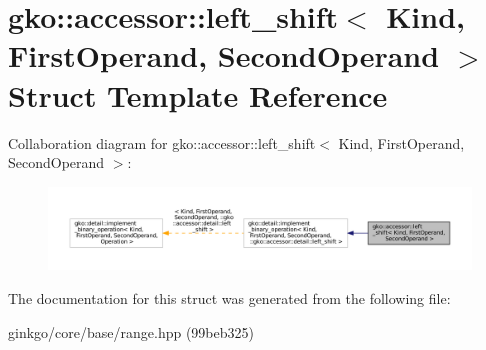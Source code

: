 \hypertarget{structgko_1_1accessor_1_1left__shift}{}\section{gko\+:\+:accessor\+:\+:left\+\_\+shift$<$ Kind, First\+Operand, Second\+Operand $>$ Struct Template Reference}
\label{structgko_1_1accessor_1_1left__shift}


Collaboration diagram for gko\+:\+:accessor\+:\+:left\+\_\+shift$<$ Kind, First\+Operand, Second\+Operand $>$\+:
\nopagebreak
\begin{figure}[H]
\begin{center}
\leavevmode
\includegraphics[width=350pt]{structgko_1_1accessor_1_1left__shift__coll__graph}
\end{center}
\end{figure}


The documentation for this struct was generated from the following file\+:\begin{DoxyCompactItemize}
\item 
ginkgo/core/base/range.\+hpp (99beb325)\end{DoxyCompactItemize}
